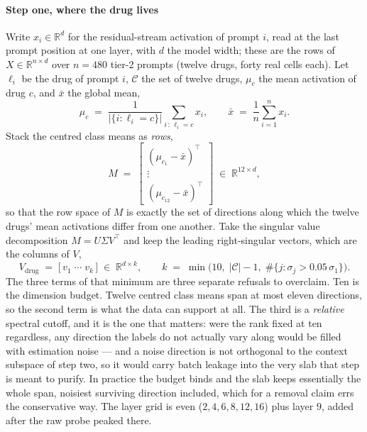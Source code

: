 \paragraph{Step one, where the drug lives} Write $x_i \in \mathbb{R}^{d}$ for
the residual-stream activation of prompt $i$, read at the last prompt position
at one layer, with $d$ the model width; these are the rows of
$X \in \mathbb{R}^{n \times d}$ over $n = \num{480}$ tier-2 prompts (twelve
drugs, forty real cells each). Let $\ell_i$ be the drug of prompt $i$,
$\mathcal{C}$ the set of twelve drugs, $\mu_c$ the mean activation of drug $c$,
and $\bar{x}$ the global mean,
\begin{equation}
  \mu_c \;=\; \frac{1}{|\{i : \ell_i = c\}|} \sum_{i \,:\, \ell_i = c} x_i ,
  \qquad
  \bar{x} \;=\; \frac{1}{n} \sum_{i=1}^{n} x_i .
\end{equation}
Stack the centred class means as \emph{rows},
\begin{equation}
  M \;=\;
  \begin{bmatrix}
    (\mu_{c_1} - \bar{x})^{\top} \\[2pt] \vdots \\[2pt]
    (\mu_{c_{12}} - \bar{x})^{\top}
  \end{bmatrix}
  \;\in\; \mathbb{R}^{12 \times d},
\end{equation}
so that the row space of $M$ is exactly the set of directions along which the
twelve drugs' mean activations differ from one another. Take the singular value
decomposition $M = U \Sigma V^{\top}$ and keep the leading right-singular
vectors, which are the columns of $V$,
\begin{equation}
  V_{\textrm{drug}} \;=\; \big[\, v_1 \;\cdots\; v_k \,\big]
  \;\in\; \mathbb{R}^{d \times k},
  \qquad
  k \;=\; \min\!\big( 10,\; |\mathcal{C}| - 1,\;
          \#\{ j : \sigma_j > 0.05\,\sigma_1 \} \big).
\end{equation}
The three terms of that minimum are three separate refusals to overclaim. Ten is
the dimension budget. Twelve centred class means span at most eleven directions,
so the second term is what the data can support at all. The third is a
\emph{relative} spectral cutoff, and it is the one that matters: were the rank
fixed at ten regardless, any direction the labels do not actually vary along
would be filled with estimation noise --- and a noise direction is not
orthogonal to the context subspace of step two, so it would carry batch leakage
into the very slab that step is meant to purify. In practice the budget binds
and the slab keeps essentially the whole span, noisiest surviving direction
included, which for a removal claim errs the conservative way. The layer grid is
even ($2, 4, 6, 8, 12, 16$) plus layer $9$, added after the raw probe peaked
there.


